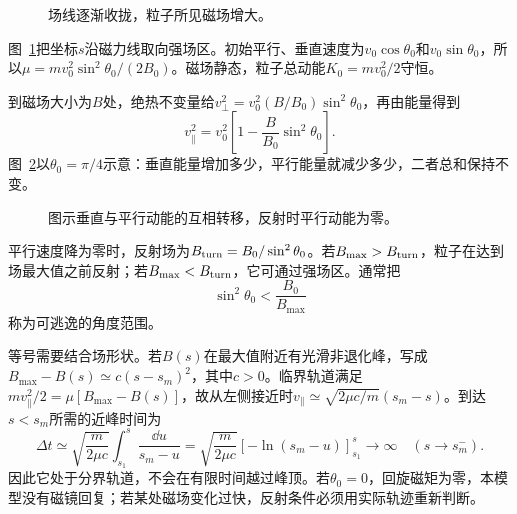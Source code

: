\begin{figure}[H]\centering
{}
\caption{场线逐渐收拢，粒子所见磁场增大。}\label{fig:i3-e1-q}
\end{figure}
\begin{solution}
图~\ref{fig:i3-e1-q}把坐标$s$沿磁力线取向强场区。初始平行、垂直速度为$v_0\cos\theta_0$和$v_0\sin\theta_0$，所以$\mu=mv_0^2\sin^2\theta_0/(2B_0)$。磁场静态，粒子总动能$K_0=mv_0^2/2$守恒。

到磁场大小为$B$处，绝热不变量给$v_\perp^2=v_0^2(B/B_0)\sin^2\theta_0$，再由能量得到
\[\boxed{v_\parallel^2=v_0^2\left[1-\frac B{B_0}\sin^2\theta_0\right]}.
\]
图~\ref{fig:i3-e1-s}以$\theta_0=\pi/4$示意：垂直能量增加多少，平行能量就减少多少，二者总和保持不变。


\begin{figure}[H]\centering
{}
\caption{图示垂直与平行动能的互相转移，反射时平行动能为零。}\label{fig:i3-e1-s}
\end{figure}

平行速度降为零时，反射场为$B_{\rm turn}=B_0/\sin^2\theta_0$。若$B_{\max}>B_{\rm turn}$，粒子在达到场最大值之前反射；若$B_{\max}<B_{\rm turn}$，它可通过强场区。通常把
\[\sin^2\theta_0<\frac{B_0}{B_{\max}}
\]
称为可逃逸的角度范围。

等号需要结合场形状。若$B(s)$在最大值附近有光滑非退化峰，写成$B_{\max}-B(s)\simeq c(s-s_m)^2$，其中$c>0$。临界轨道满足$mv_\parallel^2/2=\mu[B_{\max}-B(s)]$，故从左侧接近时$v_\parallel\simeq\sqrt{2\mu c/m}(s_m-s)$。到达$s<s_m$所需的近峰时间为
\[\Delta t\simeq\sqrt{\frac{m}{2\mu c}}\int_{s_1}^{s}\frac{\dd u}{s_m-u}
=\sqrt{\frac{m}{2\mu c}}[-\ln(s_m-u)]_{s_1}^{s}
\longrightarrow\infty\quad(s\to s_m^-).\]
因此它处于分界轨道，不会在有限时间越过峰顶。若$\theta_0=0$，回旋磁矩为零，本模型没有磁镜回复；若某处磁场变化过快，反射条件必须用实际轨迹重新判断。
\end{solution}


